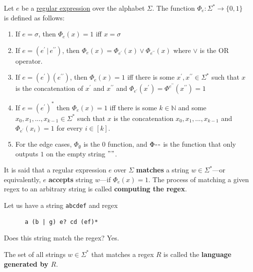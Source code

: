 	\begin{definition}
	  \label{def:matching-a-regex}
		Let $e$ be a \hyperref[def:regular_expression]{regular expression} over the alphabet $\Sigma$. The function $\Phi_e : \Sigma^* \to \{0,1\}$ is defined as follows: 
		\begin{enumerate}
			\item If $e = \sigma$, then $\Phi_e (x) = 1$ iff $x = \sigma$ 
			\item If $e = (e^\prime \,|\, e^{\prime\prime})$, then $\Phi_e (x) = \Phi_{e^\prime} (x) \vee \Phi_{e^{\prime\prime}} (x)$ where $\vee$ is the OR operator. 
			\item If $e = (e^\prime) (e^{\prime\prime})$, then $\Phi_e (x) = 1$ iff there is some $x^\prime, x^{\prime\prime} \in \Sigma^*$ such that $x$ is the concatenation of $x^\prime$ and $x^{\prime\prime}$ and $\Phi_{e^\prime} (x^\prime) = \Phi^{e^{\prime\prime}} (x^{\prime\prime}) = 1$ 
			\item If $e = (e^\prime)^*$ then $\Phi_e (x) = 1$ iff there is some $k \in \mathbb{N}$ and some $x_0, x_1, ..., x_{k-1} \in \Sigma^*$ such that $x$ is the concatenation $x_0, x_1, ..., x_{k-1}$ and $\Phi_{e^\prime} (x_i) = 1$ for every $i \in [k]$. 
			\item For the edge cases, $\Phi_{\emptyset}$ is the $0$ function, and $\Phi_{""}$ is the function that only outputs $1$ on the empty string $""$. 
		\end{enumerate}
		It is said that a regular expression $e$ over $\Sigma$ \textbf{matches} a string $w \in \Sigma^*$---or equivalently, $e$ \textbf{accepts} string $w$---if $\Phi_e (x) = 1$. The process of matching a given regex to an arbitrary string is called \textbf{computing the regex}. 
  \end{definition}

	\begin{example}
	  \label{ex:matching-a-regex}
    Let us have a string \texttt{abcdef} and regex 
    \begin{lstlisting}
      a (b | g) e? cd (ef)*
    \end{lstlisting}
    Does this string match the regex? Yes. 
  \end{example}

  \begin{definition}
    \label{def:recognized-language-of-a-regex}
		The set of all strings $w \in \Sigma^\ast$ that matches a regex $R$ is called the \textbf{language generated by $R$}. 
  \end{definition}

